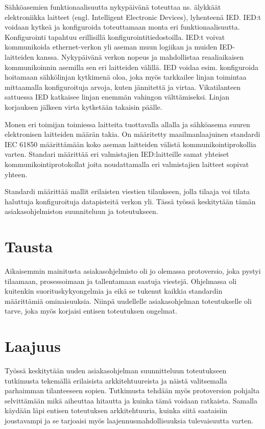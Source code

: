 Sähköasemien funktionaalisuutta nykypäivänä toteuttaa ns. älykkäät elektroniikka laitteet (engl. Intelligent Electronic Devices), lyhenteenä IED. IED:t voidaan kytkeä ja konfiguroida toteuttamaan monta eri funktionaalisuutta. Konfigurointi tapahtuu erillisillä konfigurointitiedostoilla. IED:t voivat kommunikoida ethernet-verkon yli aseman muun logiikan ja muiden IED-laitteiden kanssa. Nykypäivänä verkon nopeus ja mahdollistaa reaaliaikaisen kommunikoinnin asemilla sen eri laitteiden välillä. IED voidaa esim. konfiguroida hoitamaan sähkölinjan kytkimenä oloa, joka myös tarkkailee linjan toimintaa mittaamalla konfiguroituja arvoja, kuten jännitettä ja virtaa. Vikatilanteen sattuessa IED katkaisee linjan enemmän vahingon välttämiseksi. Linjan korjauksen jälkeen virta kytketään takaisin päälle.

Monen eri toimijan toimiessa laitteita tuottavalla allalla ja sähköasema suuren elektronisen laitteiden määrän takia. On määritetty maailmanlaajuinen standardi IEC 61850 määrittämään koko aseman laitteiden välistä kommunikointiprokollia varten. Standari määrittää eri valmistajien IED:laitteille samat yhteiset kommunikointiprotokollat joita noudattamalla eri valmistajien laitteet sopivat yhteen.

Standardi määrittää mallit erilaisten viestien tilaukseen, jolla tilaaja voi tilata haluttuja konfiguroituja datapisteitä verkon yli. Tässä työssä keskitytään tämän asiakasohjelmiston suunniteluun ja toteutukseen.

\section{Tausta}

Aikaisemmin mainitusta asiakasohjelmisto oli jo olemassa protoversio, joka pystyi tilaamaan, prosessoimaan ja tallentamaan saatuja viestejä. Ohjelmassa oli kuitenkin suorituskykyongelmia ja eikä se tukenut kaikkia standardin määrittämiä ominaisuuksia. Niinpä uudellelle asiakasohjelman toteutukselle oli tarve, joka myös korjaisi entisen toteutuksen ongelmat.

\section{Laajuus}

Työssä keskitytään uuden asiakasohjelman suunnitteluun toteutukseen tutkimusta tekemällä erilaisista arkkitehtuureista ja näistä valitsemalla parhaimman tilanteeseen sopien. Tutkimusta tehdään myös protoversion pohjalta selvittämään mikä aiheuttaa hitautta ja kuinka tämä voidaan ratkaista. Samalla käydään läpi entisen toteutuksen arkkitehtuuria, kuinka siitä saataisiin joustavampi ja se tarjoaisi myös laajennusmahdollisuuksia tulevaisuutta varten.

